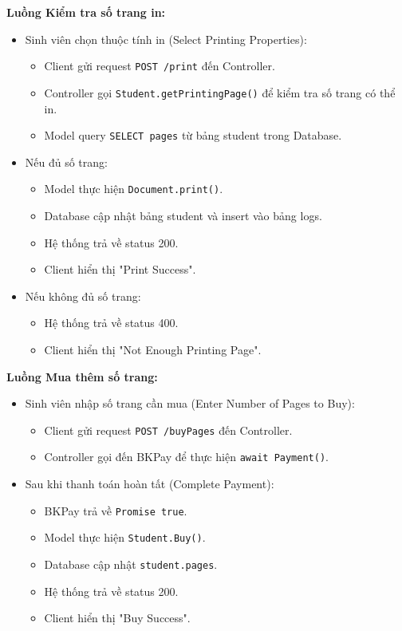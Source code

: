 \textbf{Luồng Kiểm tra số trang in:}
\begin{itemize}
    \item Sinh viên chọn thuộc tính in (Select Printing Properties):
    \begin{itemize}
        \item Client gửi request \texttt{POST /print} đến Controller.
        \item Controller gọi \texttt{Student.getPrintingPage()} để kiểm tra số trang có thể in.
        \item Model query \texttt{SELECT pages} từ bảng student trong Database.
    \end{itemize}
    \item Nếu đủ số trang:
    \begin{itemize}
        \item Model thực hiện \texttt{Document.print()}.
        \item Database cập nhật bảng student và insert vào bảng logs.
        \item Hệ thống trả về status 200.
        \item Client hiển thị "Print Success".
    \end{itemize}
    \item Nếu không đủ số trang:
    \begin{itemize}
        \item Hệ thống trả về status 400.
        \item Client hiển thị "Not Enough Printing Page".
    \end{itemize}
\end{itemize}

\textbf{Luồng Mua thêm số trang:}
\begin{itemize}
    \item Sinh viên nhập số trang cần mua (Enter Number of Pages to Buy):
    \begin{itemize}
        \item Client gửi request \texttt{POST /buyPages} đến Controller.
        \item Controller gọi đến BKPay để thực hiện \texttt{await Payment()}.
    \end{itemize}
    \item Sau khi thanh toán hoàn tất (Complete Payment):
    \begin{itemize}
        \item BKPay trả về \texttt{Promise true}.
        \item Model thực hiện \texttt{Student.Buy()}.
        \item Database cập nhật \texttt{student.pages}.
        \item Hệ thống trả về status 200.
        \item Client hiển thị "Buy Success".
    \end{itemize}
\end{itemize}


